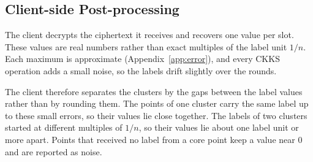 
\subsection{Client-side Post-processing}
\label{sec:post}

The client decrypts the ciphertext it receives and recovers one value per
slot. These values are real numbers rather than exact multiples of the
label unit $1/n$. Each maximum is approximate
(Appendix~\ref{app:error}), and every CKKS operation adds a small noise,
so the labels drift slightly over the rounds.

The client therefore separates the clusters by the gaps between the label
values rather than by rounding them. The points of one cluster carry the
same label up to these small errors, so their values lie close together.
The labels of two clusters started at different multiples of $1/n$, so
their values lie about one label unit or more apart. Points that received
no label from a core point keep a value near $0$ and are reported as
noise.

